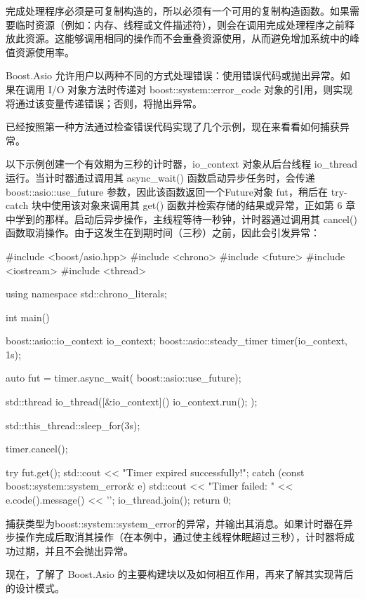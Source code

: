 完成处理程序必须是可复制构造的，所以必须有一个可用的复制构造函数。如果需要临时资源（例如：内存、线程或文件描述符），则会在调用完成处理程序之前释放此资源。这能够调用相同的操作而不会重叠资源使用，从而避免增加系统中的峰值资源使用率。


Boost.Asio 允许用户以两种不同的方式处理错误：使用错误代码或抛出异常。如果在调用 I/O 对象方法时传递对 boost::system::error\_code 对象的引用，则实现将通过该变量传递错误；否则，将抛出异常。

已经按照第一种方法通过检查错误代码实现了几个示例，现在来看看如何捕获异常。

以下示例创建一个有效期为三秒的计时器，io\_context 对象从后台线程 io\_thread 运行。当计时器通过调用其 async\_wait() 函数启动异步任务时，会传递 boost::asio::use\_future 参数，因此该函数返回一个Future对象 fut，稍后在 try-catch 块中使用该对象来调用其 get() 函数并检索存储的结果或异常，正如第 6 章中学到的那样。启动后异步操作，主线程等待一秒钟，计时器通过调用其 cancel() 函数取消操作。由于这发生在到期时间（三秒）之前，因此会引发异常：

\begin{cpp}
#include <boost/asio.hpp>
#include <chrono>
#include <future>
#include <iostream>
#include <thread>

using namespace std::chrono_literals;

int main() {
    boost::asio::io_context io_context;
    boost::asio::steady_timer timer(io_context, 1s);

    auto fut = timer.async_wait(
                        boost::asio::use_future);

    std::thread io_thread([&io_context]() {
                        io_context.run();
    });

    std::this_thread::sleep_for(3s);

    timer.cancel();

    try {
        fut.get();
        std::cout << "Timer expired successfully!\n";
    } catch (const boost::system::system_error& e) {
        std::cout << "Timer failed: "
                  << e.code().message() << '\n';
    }
    io_thread.join();
    return 0;
}
\end{cpp}

捕获类型为boost::system::system\_error的异常，并输出其消息。如果计时器在异步操作完成后取消其操作（在本例中，通过使主线程休眠超过三秒），计时器将成功过期，并且不会抛出异常。

现在，了解了 Boost.Asio 的主要构建块以及如何相互作用，再来了解其实现背后的设计模式。








